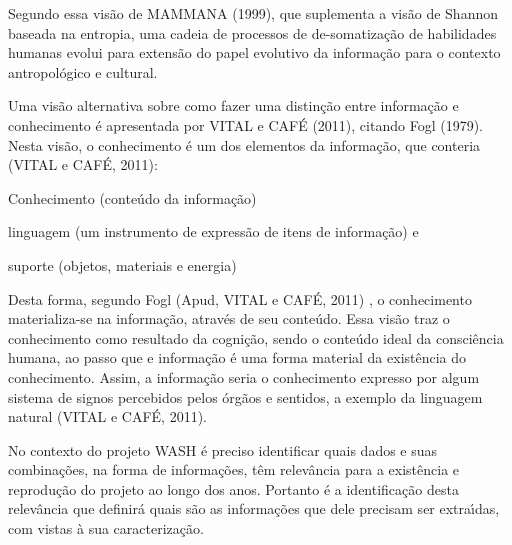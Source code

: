 \documentclass[
12pt,		%
openright,	%
twoside,  %
a4paper,			%
chapter=TITLE,		%
english,			%
french,				%
spanish,			%
brazil				%
]{USPSC-classe/USPSC}
\begin{document}
Segundo essa vis\~ao de  MAMMANA (1999), que suplementa a vis\~ao de Shannon baseada na entropia, uma cadeia de processos de de-somatiza\c{c}\~ao de habilidades humanas evolui para extens\~ao do papel evolutivo da informa\c{c}\~ao para o contexto antropol\'ogico e cultural.










Uma vis\~ao alternativa sobre como fazer uma distin\c{c}\~ao entre informa\c{c}\~ao e conhecimento \'e apresentada por  VITAL e CAF\'E (2011), citando Fogl (1979). Nesta vis\~ao, o conhecimento \'e um dos elementos da informa\c{c}\~ao, que conteria (VITAL e CAF\'E, 2011):











\begin{alineas}
\item Conhecimento (conte\'udo da informa\c{c}\~ao)
\item linguagem (um instrumento de express\~ao de itens de informa\c{c}\~ao) e
\item suporte (objetos, materiais e energia)
\end{alineas}

Desta forma, segundo Fogl  (Apud, VITAL e CAF\'E, 2011) , \textquotedbl o conhecimento materializa-se na informa\c{c}\~ao, atrav\'es de seu conte\'udo\textquotedbl . Essa vis\~ao traz o conhecimento como resultado da cogni\c{c}\~ao, sendo \textquotedbl o conte\'udo ideal da consci\^encia humana\textquotedbl , ao passo que e informa\c{c}\~ao \'e uma forma material da exist\^encia do conhecimento. Assim, a informa\c{c}\~ao seria o conhecimento expresso por algum \textquotedbl sistema de signos percebidos pelos \'org\~aos e sentidos\textquotedbl , a exemplo da linguagem natural  (VITAL e CAF\'E, 2011).










No contexto do projeto WASH \'e preciso identificar quais dados e suas combina\c{c}\~oes, na forma de informa\c{c}\~oes, t\^em relev\^ancia para a exist\^encia e reprodu\c{c}\~ao do projeto ao longo dos anos. Portanto \'e a identifica\c{c}\~ao desta relev\^ancia que definir\'a quais s\~ao as informa\c{c}\~oes que dele precisam ser extra\'{\i}das, com vistas \`a sua caracteriza\c{c}\~ao.
\end{document}
